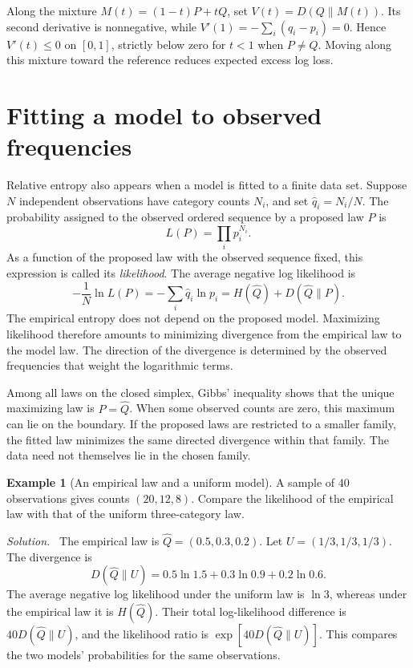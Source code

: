 \documentclass[11pt,oneside,openany]{book}
\theoremstyle{definition}
\newtheorem{example}{Example}[chapter]
\theoremstyle{remark}
\newenvironment{solution}{\par\smallskip\noindent\textit{Solution.}\ }{\par\smallskip}
\numberwithin{equation}{chapter}
\begin{document}
Along the mixture $M(t)=(1-t)P+tQ$, set $V(t)=D(Q\|M(t))$. Its second derivative is nonnegative, while $V'(1)=-\sum_i(q_i-p_i)=0$. Hence $V'(t)\leq0$ on $[0,1]$, strictly below zero for $t<1$ when $P\ne Q$. Moving along this mixture toward the reference reduces expected excess log loss.

\section{Fitting a model to observed frequencies}
Relative entropy also appears when a model is fitted to a finite data set. Suppose $N$ independent observations have category counts $N_i$, and set $\widehat q_i=N_i/N$. The probability assigned to the observed ordered sequence by a proposed law $P$ is
\[
L(P)=\prod_i p_i^{N_i}.
\]
As a function of the proposed law with the observed sequence fixed, this expression is called its \emph{likelihood}. The average negative log likelihood is
\[
-\frac1N\ln L(P)=-\sum_i\widehat q_i\ln p_i
=H(\widehat Q)+D(\widehat Q\|P).
\]
The empirical entropy does not depend on the proposed model. Maximizing likelihood therefore amounts to minimizing divergence from the empirical law to the model law. The direction of the divergence is determined by the observed frequencies that weight the logarithmic terms.

Among all laws on the closed simplex, Gibbs' inequality shows that the unique maximizing law is $P=\widehat Q$. When some observed counts are zero, this maximum can lie on the boundary. If the proposed laws are restricted to a smaller family, the fitted law minimizes the same directed divergence within that family. The data need not themselves lie in the chosen family.

\begin{example}[An empirical law and a uniform model]
A sample of 40 observations gives counts $(20,12,8)$. Compare the likelihood of the empirical law with that of the uniform three-category law.
\begin{solution}
The empirical law is $\widehat Q=(0.5,0.3,0.2)$. Let $U=(1/3,1/3,1/3)$. The divergence is
\[
D(\widehat Q\|U)=0.5\ln1.5+0.3\ln0.9+0.2\ln0.6.
\]
The average negative log likelihood under the uniform law is $\ln3$, whereas under the empirical law it is $H(\widehat Q)$. Their total log-likelihood difference is $40D(\widehat Q\|U)$, and the likelihood ratio is $\exp[40D(\widehat Q\|U)]$. This compares the two models' probabilities for the same observations.
\end{solution}
\end{example}
\end{document}
